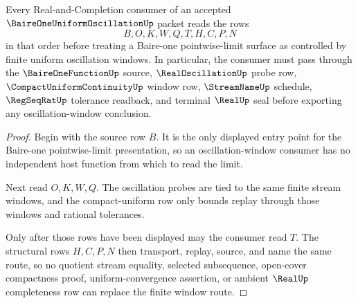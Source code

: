 \begin{theorem}
\label{thm:baire-one-uniform-oscillation-window-route}
Every Real-and-Completion consumer of an accepted $\BaireOneUniformOscillationUp$ packet reads the rows
$$
B,O,K,W,Q,T,H,C,P,N
$$
in that order before treating a Baire-one pointwise-limit surface as controlled by finite uniform oscillation windows. In particular, the consumer must pass through the $\BaireOneFunctionUp$ source, $\RealOscillationUp$ probe row, $\CompactUniformContinuityUp$ window row, $\StreamNameUp$ schedule, $\RegSeqRatUp$ tolerance readback, and terminal $\RealUp$ seal before exporting any oscillation-window conclusion.
\end{theorem}
\begin{proof}
Begin with the source row $B$. It is the only displayed entry point for the Baire-one pointwise-limit presentation, so an oscillation-window consumer has no independent host function from which to read the limit.

Next read $O,K,W,Q$. The oscillation probes are tied to the same finite stream windows, and the compact-uniform row only bounds replay through those windows and rational tolerances.

Only after those rows have been displayed may the consumer read $T$. The structural rows $H,C,P,N$ then transport, replay, source, and name the same route, so no quotient stream equality, selected subsequence, open-cover compactness proof, uniform-convergence assertion, or ambient $\RealUp$ completeness row can replace the finite window route.
\end{proof}

\begin{closurestatus}{\BaireOneUniformOscillationUp}
  \theoryclosure{\seedClosure}
  \formalstatus{\unformalizedV}
\end{closurestatus}
